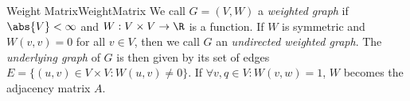 \begin{mdef}{Weight Matrix}{WeightMatrix}
    We call $G = (V,W)$ a \emph{weighted graph} if $\abs{V} < \infty$ and $W: V\times V\to \R$ is a function. If $W$ is symmetric and $W(v,v) = 0$ for all $v\in V$, then we call $G$ an \emph{undirected weighted graph}. The \emph{underlying graph} of $G$ is then given by its set of edges $E = \{(u,v)\in V\times V: W(u,v)\neq 0\}$. If $\forall v,q\in V:W(v,w)=1$, $W$ becomes the adjacency matrix $A$.
\end{mdef}